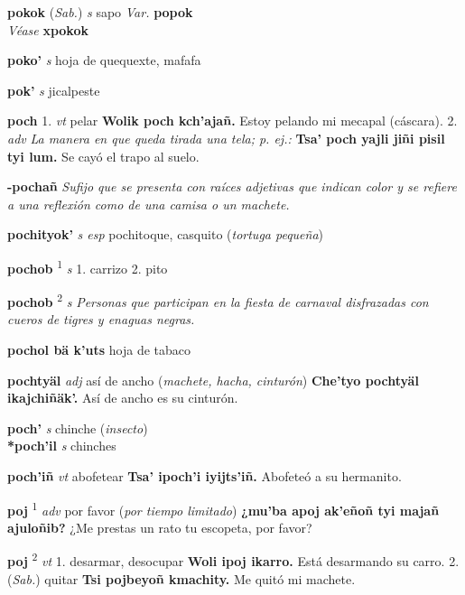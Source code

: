 \documentclass[10pt]{scrbook}
\newcommand{\entry}[1]{\textbf{#1}}
\newcommand{\onedefinition}[1]{#1.}
\newcommand{\defsuperscript}[1]{\textsuperscript{#1}}
\newcommand{\nontranslationdef}[1]{\textit{#1}}
\newcommand{\partofspeech}[1]{\textit{#1}}
\newcommand{\spanishtranslation}[1]{#1}
\newcommand{\clarification}[1]{(\textit{#1})}
\newcommand{\cholexample}[1]{\textbf{#1}}
\newcommand{\exampletranslation}[1]{#1}
\newcommand{\alsosee}[1]{\\\textit{Véase} \textbf{#1}}
\newcommand{\relevantdialect}[1]{(\textit{#1})}
\newcommand{\secondaryentry}[1]{\\\textbf{#1}}
\newcommand{\secondpartofspeech}[1]{\textit{#1}}
\newcommand{\secondtranslation}[1]{#1}
\newcommand{\variation}[1]{\textit{Var.} \textbf{#1}}
\begin{document}
\begin{multicols}{2}
\entry{pokok}
\relevantdialect{Sab.}
\partofspeech{s}
\spanishtranslation{sapo}
\variation{popok}
\alsosee{xpokok}

\entry{poko'}
\partofspeech{s}
\spanishtranslation{hoja de quequexte, mafafa}

\entry{pok'}
\partofspeech{s}
\spanishtranslation{jicalpeste}

\entry{poch}
\onedefinition{1}
\partofspeech{vt}
\spanishtranslation{pelar}
\cholexample{Wolik poch kch'ajañ.}
\exampletranslation{Estoy pelando mi mecapal (cáscara).}
\onedefinition{2}
\partofspeech{adv}
\nontranslationdef{La manera en que queda tirada una tela; p. ej.:}
\cholexample{Tsa' poch yajli jiñi pisil tyi lum.}
\exampletranslation{Se cayó el trapo al suelo.}

\entry{-pochañ}
\nontranslationdef{Sufijo que se presenta con raíces adjetivas que indican color y se refiere a una reflexión como de una camisa o un machete.}

\entry{pochityok'}
\partofspeech{s esp}
\spanishtranslation{pochitoque, casquito}
\clarification{tortuga pequeña}

\entry{pochob}
\defsuperscript{1}
\partofspeech{s}
\onedefinition{1}
\spanishtranslation{carrizo}
\onedefinition{2}
\spanishtranslation{pito}

\entry{pochob}
\defsuperscript{2}
\partofspeech{s}
\nontranslationdef{Personas que participan en la fiesta de carnaval disfrazadas con cueros de tigres y enaguas negras.}

\entry{pochol bä k'uts}
\spanishtranslation{hoja de tabaco}

\entry{pochtyäl}
\partofspeech{adj}
\spanishtranslation{así de ancho}
\clarification{machete, hacha, cinturón}
\cholexample{Che'tyo pochtyäl ikajchiñäk'.}
\exampletranslation{Así de ancho es su cinturón.}

\entry{poch'}
\partofspeech{s}
\spanishtranslation{chinche}
\clarification{insecto}
\secondaryentry{*poch'il}
\secondpartofspeech{s}
\secondtranslation{chinches}

\entry{poch'iñ}
\partofspeech{vt}
\spanishtranslation{abofetear}
\cholexample{Tsa' ipoch'i iyijts'iñ.}
\exampletranslation{Abofeteó a su hermanito.}

\entry{poj}
\defsuperscript{1}
\partofspeech{adv}
\spanishtranslation{por favor}
\clarification{por tiempo limitado}
\cholexample{¿mu'ba apoj ak'eñoñ tyi majañ ajuloñib?}
\exampletranslation{¿Me prestas un rato tu escopeta, por favor?}

\entry{poj}
\defsuperscript{2}
\partofspeech{vt}
\onedefinition{1}
\spanishtranslation{desarmar, desocupar}
\cholexample{Woli ipoj ikarro.}
\exampletranslation{Está desarmando su carro.}
\onedefinition{2}
\relevantdialect{Sab.}
\spanishtranslation{quitar}
\cholexample{Tsi pojbeyoñ kmachity.}
\exampletranslation{Me quitó mi machete.}


\end{multicols}
\end{document}

